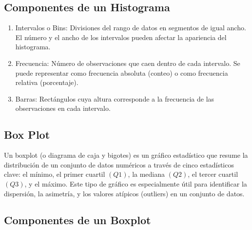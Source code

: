 \documentclass[
  us-letterpaper,
]{scrreprt}
\theoremstyle{plain}
\theoremstyle{plain}
\theoremstyle{definition}
\theoremstyle{remark}
\begin{document}
\subsection{Componentes de un
Histograma}\label{componentes-de-un-histograma}

\begin{enumerate}
\def\labelenumi{\arabic{enumi}.}
\item
  Intervalos o Bins: Divisiones del rango de datos en segmentos de igual
  ancho. El número y el ancho de los intervalos pueden afectar la
  apariencia del histograma.
\item
  Frecuencia: Número de observaciones que caen dentro de cada intervalo.
  Se puede representar como frecuencia absoluta (conteo) o como
  frecuencia relativa (porcentaje).
\item
  Barras: Rectángulos cuya altura corresponde a la frecuencia de las
  observaciones en cada intervalo.
\end{enumerate}

\subsection{Box Plot}\label{sec-boxplot}

Un boxplot (o diagrama de caja y bigotes) es un gráfico estadístico que
resume la distribución de un conjunto de datos numéricos a través de
cinco estadísticos clave: el mínimo, el primer cuartil \((Q1)\), la
mediana \((Q2)\), el tercer cuartil \((Q3)\), y el máximo. Este tipo de
gráfico es especialmente útil para identificar la dispersión, la
asimetría, y los valores atípicos (outliers) en un conjunto de datos.

\subsection{Componentes de un Boxplot}\label{componentes-de-un-boxplot}
\end{document}
